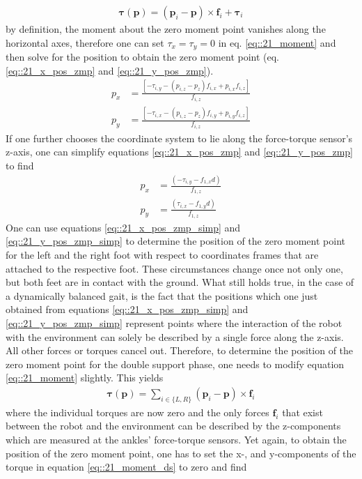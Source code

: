 \begin{align}
	\bm{\tau}(\bm{p}) = (\bm{p}_i-\bm{p})\times \bm{f}_i + \bm{\tau}_i
	\label{eq::21_moment}
\end{align}
by definition, the moment about the zero moment point vanishes along the horizontal axes, therefore one can set $\tau_x = \tau_y = 0$ in eq. \ref{eq::21_moment} and then solve for the position to obtain the zero moment point (eq. \ref{eq::21_x_pos_zmp} and \ref{eq::21_y_pos_zmp}).
\begin{align}
	p_x &= \frac{\left[-\tau_{i,y}-(p_{i,z}-p_z)f_{i,x}+p_{i,x}f_{i,z}\right]}{f_{i,z}}
	\label{eq::21_x_pos_zmp}\\
	p_y &= \frac{\left[-\tau_{i,x}-(p_{i,z}-p_z)f_{i,y}+p_{i,y}f_{i,z}\right]}{f_{i,z}}
	\label{eq::21_y_pos_zmp}
\end{align}
If one further chooses the coordinate system to lie along the force-torque sensor's z-axis, one can simplify equations \ref{eq::21_x_pos_zmp} and \ref{eq::21_y_pos_zmp} to find
\begin{align}
	p_x &= \frac{(-\tau_{i,y}-f_{1,x}d)}{f_{1,z}} 
	\label{eq::21_x_pos_zmp_simp}\\
	p_y &= \frac{(\tau_{i,x}-f_{1,y}d)}{f_{1,z}}
	\label{eq::21_y_pos_zmp_simp}
\end{align}
One can use equations \ref{eq::21_x_pos_zmp_simp} and \ref{eq::21_y_pos_zmp_simp} to determine the position of the zero moment point for the left and the right foot with respect to coordinates frames that are attached to the respective foot. These circumstances change once not only one, but both feet are in contact with the ground. What still holds true, in the case of a dynamically balanced gait, is the fact that the positions which one just obtained from equations \ref{eq::21_x_pos_zmp_simp} and \ref{eq::21_y_pos_zmp_simp} represent points where the interaction of the robot with the environment can solely be described by a single force along the z-axis. All other forces or torques cancel out. Therefore, to determine the position of the zero moment point for the double support phase, one needs to modify equation \ref{eq::21_moment} slightly. This yields 
\begin{align}
	\bm{\tau}(\bm{p}) = \sum_{i\in\{L, R\}} (\bm{p}_i - \bm{p})\times\bm{f}_i
	\label{eq::21_moment_ds}
\end{align}
where the individual torques are now zero and the only forces $\bm{f}_i$ that exist between the robot and the environment can be described by the z-components which are measured at the ankles' force-torque sensors. Yet again, to obtain the position of the zero moment point, one has to set the x-, and y-components of the torque in equation \ref{eq::21_moment_ds} to zero and find
